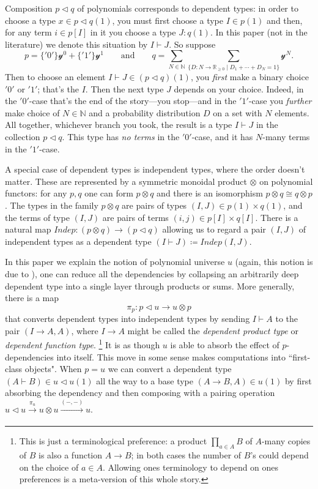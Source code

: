 \documentclass[11pt, one side, article]{memoir}
\theoremstyle{definition}
\theoremstyle{plain}
\newcommand{\Fun}[1]{\mathit{#1}}%
\newcommand{\To}[2][]{\xrightarrow[#1]{#2}}
\newcommand{\nn}{\mathbb{N}}
\newcommand{\rr}{\mathbb{R}}
\newcommand{\yon}{\mathcal{y}}
\newcommand{\0}{\textsf{0}}
\newcommand{\1}{\tn{\textsf{1}}}
\newcommand{\tri}{\mathbin{\triangleleft}}
\newcommand{\indep}{\Fun{Indep}}
\newcommand{\switch}{\pi}
\newcommand{\qqand}{\qquad\text{and}\qquad}
\begin{document}
Composition $p\tri q$ of polynomials corresponds to dependent types: in order to choose a type $x\in p\tri q(1)$, you must first choose a type $I\in p(1)$ and then, for any term $i\in p[I]$ in it you choose a type $J:q(1)$. In this paper (not in the literature) we denote this situation by $I\vdash J$. So suppose
\[
  p=\{{'0'}\}\yon^0+\{{'1'}\}\yon^1
  \qqand 
  q=\sum_{N\in\nn}\sum_{\{D\colon N\to\rr_{\geq 0}\mid D_1+\cdots+D_N=1\}}\yon^N.
\]
Then to choose an element $I\vdash J\in (p\tri q)(1)$, you \emph{first} make a binary choice ${'0'}$ or ${'1'}$; that's the $I$. Then the next type $J$ depends on your choice. Indeed, in the ${'0'}$-case that's the end of the story---you stop---and in the ${'1'}$-case you \emph{further} make choice of $N\in\nn$ and a probability distribution $D$ on a set with $N$ elements. All together, whichever branch you took, the result is a type $I\vdash J$ in the collection $p\tri q$. This type has \emph{no terms} in the ${'0'}$-case, and it has $N$-many terms in the ${'1'}$-case.

A special case of dependent types is independent types, where the order doesn't matter. These are represented by a symmetric monoidal product $\otimes$ on polynomial functors: for any $p,q$ one can form $p\otimes q$ and there is an isomorphism $p\otimes q\cong q\otimes p$. The types in the family $p\otimes q$ are pairs of types $(I,J)\in p(1)\times q(1)$, and the terms of type $(I,J)$ are pairs of terms $(i,j)\in p[I]\times q[I]$. There is a natural map $\indep\colon(p\otimes q)\to (p\tri q)$ allowing us to regard a pair $(I,J)$ of independent types as a dependent type $(I\vdash J)\coloneqq\indep(I,J)$.

In this paper we explain the notion of polynomial universe $u$ (again, this notion is due to \cite{awodey2014natural}), one can reduce all the dependencies by collapsing an arbitrarily deep dependent type into a single layer through products or sums. More generally, there is a map
\begin{equation}\label{eqn.switch}
  \switch_p\colon p\tri u\to u\otimes p
\end{equation}
that converts dependent types into independent types by sending $I\vdash A$ to the pair $(I\to A,A)$, where $I\to A$ might be called the \emph{dependent product type} or \emph{dependent function type}.%
\footnote{This is just a terminological preference: a product $\prod_{a\in A}B$ of $A$-many copies of $B$ is also a function $A\to B$; in both cases the number of $B$'s could depend on the choice of $a\in A$. Allowing ones terminology to depend on ones preferences is a meta-version of this whole story.}
It is as though $u$ is able to absorb the effect of $p$-dependencies into itself. This move in some sense makes computations into ``first-class objects". When $p=u$ we can convert a dependent type $(A\vdash B)\in u\tri u(1)$ all the way to a base type $(A\to B,A)\in u(1)$ by first absorbing the dependency and then composing with a pairing operation $u\tri u\To{\switch_u} u\otimes u\To{(-,-)} u$.
\end{document}
